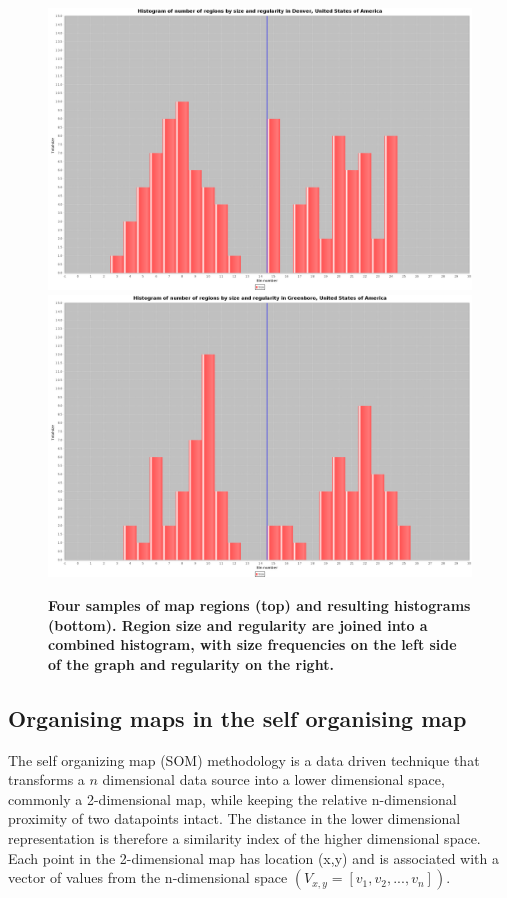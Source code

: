 \documentclass{nature}
\begin{document}
\begin{figure}
\includegraphics[scale=0.06]{Images/Combinedcity169-59949.png}
\includegraphics[scale=0.06]{Images/Combinedcity1521-754459.png}
\caption{\bf Four samples of map regions (top) and resulting histograms (bottom). Region size and regularity are joined into a combined histogram, with size frequencies on the left side of the graph and regularity on the right.}    
 \label{fig:mapsandHist}  
\end{figure} 


\subsection{Organising maps in the self organising map}\label{methodscluster}
The self organizing map (SOM) methodology \cite{Kohonen1982} is a data driven technique that transforms a $n$ dimensional data source into a lower dimensional space, commonly a 2-dimensional map, while keeping the relative n-dimensional proximity of two datapoints intact. The distance in the lower dimensional representation is therefore a similarity index of the higher dimensional space. Each point in the 2-dimensional map has location (x,y) and is associated with a vector of values from the n-dimensional space $(V_{x,y} = [v_{1},v_{2},...,v_{n}])$.
\end{document}
